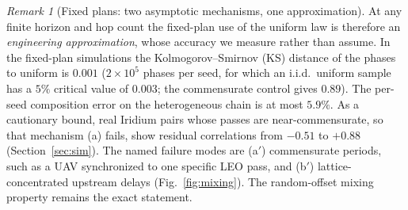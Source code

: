 \documentclass[twocolumn,3p,times,procedia]{elsarticle}
\theoremstyle{plain}
\theoremstyle{remark}
\newtheorem{remark}{Remark}
\begin{document}
\begin{remark}[Fixed plans: two asymptotic mechanisms, one
approximation]
At any finite horizon and hop count the fixed-plan use of the uniform
law is therefore an \emph{engineering approximation}, whose accuracy we
measure rather than assume. In the fixed-plan simulations the
Kolmogorov--Smirnov (KS) distance of the phases to uniform is $0.001$
($2\times10^{5}$ phases per seed, for which an i.i.d.\ uniform sample
has a $5\%$ critical value of $0.003$; the commensurate control gives
$0.89$). The per-seed composition error on the heterogeneous chain is
at most $5.9\%$. As a cautionary bound, real Iridium pairs whose passes
are near-commensurate, so that mechanism (a) fails, show residual
correlations from $-0.51$ to $+0.88$ (Section~\ref{sec:sim}). The named
failure modes are (a$'$) commensurate periods, such as a UAV
synchronized to one specific LEO pass, and (b$'$) lattice-concentrated
upstream delays (Fig.~\ref{fig:mixing}). The random-offset mixing
property remains the exact statement.
\end{remark}
\end{document}
